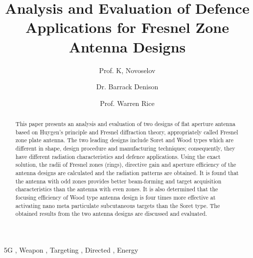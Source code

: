 \documentclass[review]{elsarticle}
\begin{document}
\begin{frontmatter}

\title{Analysis and Evaluation of Defence Applications for Fresnel Zone Antenna Designs}

\author{Prof. K, Novoselov}
\address{National Graphene Institute, Manchester}

\author{Dr. Barrack Denison}
\address{National High Magnetic Field Laboratory, Los Alamos National Laboratory, New Mexico, United States}

\author{Prof. Warren Rice}
\address{Miskatonik University, Essex County, Massachusetts, United States}

\begin{abstract}
This paper presents an analysis and evaluation of two designs of flat aperture antenna based on Huygen's principle and Fresnel diffraction theory, appropriately called Fresnel zone plate antenna. The two leading designs include Soret and Wood types which are different in shape, design procedure and manufacturing techniques; consequently, they have different radiation characteristics and defence applications. Using the exact solution, the radii of Fresnel zones (rings), directive gain and aperture efficiency of the antenna designs are calculated and the radiation patterns are obtained. It is found that the antenna with odd zones provides better beam-forming and target acquisition characteristics than the antenna with even zones. It is also determined that the focusing efficiency of Wood type antenna design is four times more effective at activating nano meta particulate subcutaneous targets than the Soret type. The obtained results from the two antenna designs are discussed and evaluated.
\end{abstract}

\begin{keyword}
5G \sep
Weapon \sep 
Targeting \sep 
Directed \sep 
Energy
\end{keyword}
\end{frontmatter}
\end{document}
